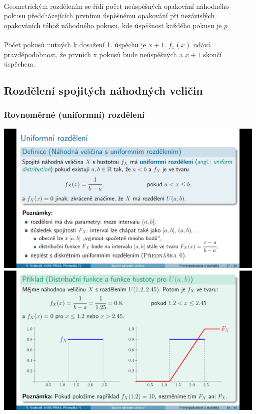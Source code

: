 \documentclass[12pt,a4paper]{article}
\begin{document}
\paragraph{} Geometrickým rozdělením se řídí počet neúspěšných opakování náhodného pokusu předcházejících prvnímu úspěšnému opakování při nezávislých opakováních téhož náhodného pokusu, kde úspěšnost každého pokusu je $p$
\paragraph{} Počet pokusů nutných k dosažení 1. úspěchu je $x + 1$. $f_x(x)$ udává pravděpodobnost, že prvních x pokusů bude neúspěšných a $x + 1$ skončí úspěchem.
\newpage
\subsection{Rozdělení spojitých náhodných veličin}
\subsubsection{Rovnoměrné (uniformní) rozdělení}
\begin{center}
	\includegraphics[scale=0.30]{img/spojite_rozdeleni_uniformni}
	\includegraphics[scale=0.30]{img/spojite_rozdeleni_uniformni_priklad}
\end{center}
\end{document}
